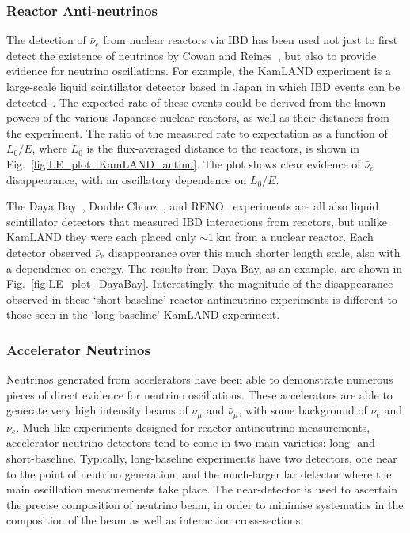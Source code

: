 \subsubsection{Reactor Anti-neutrinos}
The detection of $\bar{\nu}_{e}$ from nuclear reactors via IBD has been used not just to first detect the existence of neutrinos by Cowan and Reines~\cite{cowanDetectionFreeNeutrino1956,reinesNeutrino1956}, but also to provide evidence for neutrino oscillations. For example, the KamLAND experiment is a large-scale liquid scintillator detector based in Japan in which IBD events can be detected~\cite{gandoReactorOnoffAntineutrino2013}. %
The expected rate of these events could be derived from the known powers of the various Japanese nuclear reactors, as well as their distances from the experiment. The ratio of the measured rate to expectation as a function of $L_{0}/E$, where $L_{0}$ is the flux-averaged distance to the reactors, is shown in Fig.~\ref{fig:LE_plot_KamLAND_antinu}. The plot shows clear evidence of $\bar{\nu}_{e}$ disappearance, with an oscillatory dependence on $L_{0}/E$.

The Daya Bay~\cite{adeyMeasurementElectronAntineutrino2018}, Double Chooz~\cite{dekerretDoubleChoozTh132020}, and RENO~\cite{bakMeasurementReactorAntineutrino2018} experiments are all also liquid scintillator detectors that measured IBD interactions from reactors, but unlike KamLAND they were each placed only $\sim\SI{1}{\km}$ from a nuclear reactor. Each detector observed $\bar{\nu}_{e}$ disappearance over this much shorter length scale, also with a dependence on energy. The results from Daya Bay, as an example, are shown in Fig.~\ref{fig:LE_plot_DayaBay}. Interestingly, the magnitude of the disappearance observed in these `short-baseline' reactor antineutrino experiments is different to those seen in the `long-baseline' KamLAND experiment.

\subsubsection{Accelerator Neutrinos}
Neutrinos generated from accelerators have been able to demonstrate numerous pieces of direct evidence for neutrino oscillations. These accelerators are able to generate very high intensity beams of $\nu_{\mu}$ and $\bar{\nu}_{\mu}$, with some background of $\nu_{e}$ and $\bar{\nu}_{e}$. Much like experiments designed for reactor antineutrino measurements, accelerator neutrino detectors tend to come in two main varieties: long- and short-baseline. Typically, long-baseline experiments have two detectors, one near to the point of neutrino generation, and the much-larger far detector where the main oscillation measurements take place. The near-detector is used to ascertain the precise composition of neutrino beam, in order to minimise systematics in the composition of the beam as well as interaction cross-sections.


